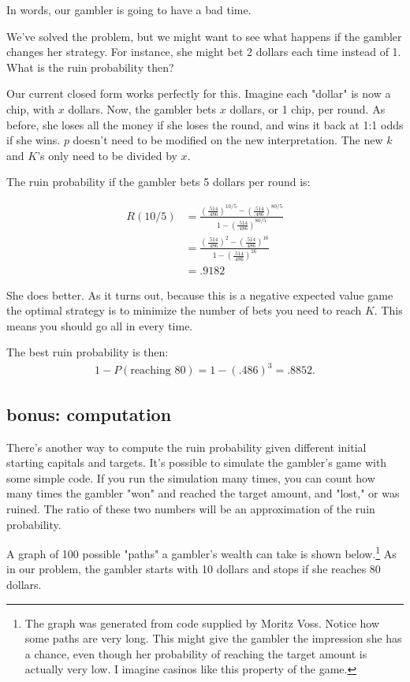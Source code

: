 \documentclass[12pt]{article}
\theoremstyle{definition}
\begin{document}
In words, our gambler is going to have a bad time.

We've solved the problem, but we might want to see what happens if the gambler changes her strategy. For instance, she might bet 2 dollars each time instead of 1. What is the ruin probability then?

Our current closed form works perfectly for this. Imagine each "dollar" is now a chip, with $x$ dollars. Now, the gambler bets $x$ dollars, or 1 chip, per round. As before, she loses all the money if she loses the round, and wins it back at 1:1 odds if she wins. $p$ doesn't need to be modified on the new interpretation. The new $k$ and $K$'s only need to be divided by $x$.

The ruin probability if the gambler bets 5 dollars per round is:

\begin{align*}
  R(10/5) &= \frac{(\frac{.514}{.486})^{10/5} - (\frac{.514}{.486})^{80/5}}{1- (\frac{.514}{.486})^{80/5}} \\
  & = \frac{(\frac{.514}{.486})^{2} - (\frac{.514}{.486})^{16}}{1- (\frac{.514}{.486})^{16}} \\
  & = .9182
\end{align*}

She does better. As it turns out, because this is a negative expected value game the optimal strategy is to minimize the number of bets you need to reach $K$. This means you should go all in every time.

The best ruin probability is then:
\begin{align*}
  1-P(\text{reaching 80}) = 1-(.486)^3 = .8852.
\end{align*}

\subsection{bonus: computation}
There's another way to compute the ruin probability given different initial starting capitals and targets. It's possible to simulate the gambler's game with some simple code. If you run the simulation many times, you can count how many times the gambler "won" and reached the target amount, and "lost," or was ruined. The ratio of these two numbers will be an approximation of the ruin probability.

A graph of 100 possible "paths" a gambler's wealth can take is shown below.\footnote{The graph was generated from code supplied by Moritz Voss. Notice how some paths are very long. This might give the gambler the impression she has a chance, even though her probability of reaching the target amount is actually very low. I imagine casinos like this property of the game.} As in our problem, the gambler starts with 10 dollars and stops if she reaches 80 dollars.
\end{document}
